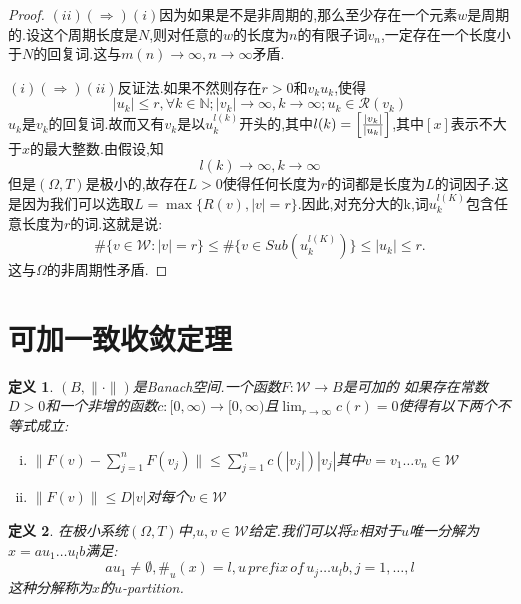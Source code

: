 \documentclass[a4paper,11pt,oneside]{book}
\newtheorem{definition}{\textbf{\hspace{0.7cm}定义}}[section]
\begin{document}
\begin{proof}
$(ii)(\Rightarrow)(i)$因为如果是不是非周期的,那么至少存在一个元素$w$是周期的.设这个周期长度是$N$,则对任意的$w$的长度为$n$的有限子词$v_n$,一定存在一个长度小于$N$的回复词.这与$m(n)\rightarrow \infty,n\rightarrow \infty$矛盾.

$(i)(\Rightarrow)(ii)$反证法.如果不然则存在$r>0$和${v_k}{u_k}$,使得
$$|u_k|\leq r,\forall k\in\mathbb{N};|v_k|\rightarrow \infty ,k\rightarrow \infty;u_k\in\mathcal{R}(v_k)$$
$u_k$是$v_k$的回复词.故而又有$v_k$是以$u_k^{l(k)}$开头的,其中$l(k)=\left[{|v_k|\over |u_k|}\right]$,其中$[x]$表示不大于$x$的最大整数.由假设,知
\begin{equation*}
l(k)\rightarrow \infty,k\rightarrow \infty
\end{equation*}
但是$(\Omega,T)$是极小的,故存在$L>0$使得任何长度为$r$的词都是长度为$L$的词因子.这是因为我们可以选取$L=\max\{R(v),|v|=r\}$.因此,对充分大的k,词$u_k^{l(K)}$包含任意长度为$r$的词.这就是说:
$$\#\{v\in\mathcal{W}:|v|=r\}\leq\#\{v\in Sub(u_k^{l(K)})\}\leq |u_k|\leq r.$$
这与$\Omega$的非周期性矛盾.

\end{proof}


\section{可加一致收敛定理}
\begin{definition}
$(B,\|\cdot\|)$是Banach空间.一个函数$F:\mathcal{W}\rightarrow B$是可加的
如果存在常数$D>0$和一个非增的函数$c:[0,\infty)\rightarrow [0,\infty)$且$\lim_{r\to\infty}c(r)=0$使得有以下两个不等式成立:
\begin{enumerate}[(i)]
\item $\|F(v)-\sum_{j=1}^nF(v_j)\|\leq\sum_{j=1}^n c(|v_j|)|v_j|$其中$v=v_1\ldots v_n\in\mathcal{W}$
\item $\|F(v)\|\leq D|v|$对每个$v\in\mathcal{W}$
\end{enumerate}
\end{definition}

\begin{definition}
在极小系统$(\Omega,T)$中,$u,v\in\mathcal{W}$给定.我们可以将$x$相对于$u$唯一分解为$x=au_1\ldots u_lb$满足:
$$au_1\ne\emptyset,\#_u(x)=l,u\, pre\!fix\, o\!f\, u_j\ldots u_lb,j=1,\ldots,l$$
这种分解称为$x$的$u$-partition.
\end{definition}
\end{document}
